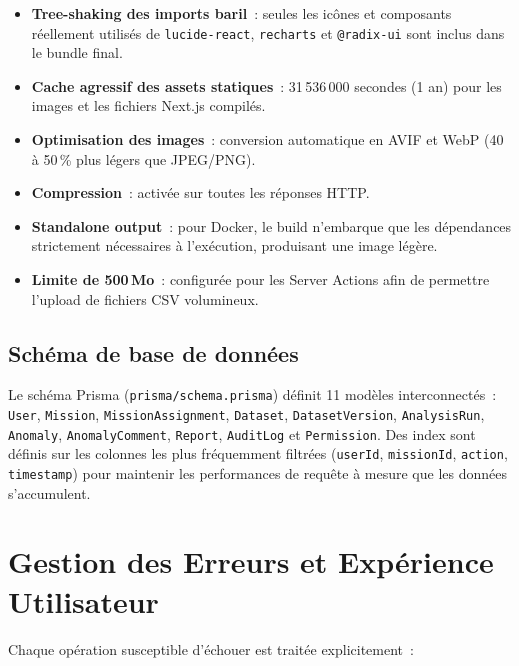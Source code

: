 \begin{itemize}[leftmargin=1.5em]
  \item \textbf{Tree-shaking des imports baril}~: seules les icônes et composants réellement utilisés de \texttt{lucide-react}, \texttt{recharts} et \texttt{@radix-ui} sont inclus dans le bundle final.
  \item \textbf{Cache agressif des assets statiques}~: 31\,536\,000 secondes (1 an) pour les images et les fichiers Next.js compilés.
  \item \textbf{Optimisation des images}~: conversion automatique en AVIF et WebP (40 à 50\,\% plus légers que JPEG/PNG).
  \item \textbf{Compression}~: activée sur toutes les réponses HTTP.
  \item \textbf{Standalone output}~: pour Docker, le build n'embarque que les dépendances strictement nécessaires à l'exécution, produisant une image légère.
  \item \textbf{Limite de 500\,Mo}~: configurée pour les Server Actions afin de permettre l'upload de fichiers CSV volumineux.
\end{itemize}

\subsection{Schéma de base de données}

Le schéma Prisma (\texttt{prisma/schema.prisma}) définit 11 modèles interconnectés~: \texttt{User}, \texttt{Mission}, \texttt{MissionAssignment}, \texttt{Dataset}, \texttt{DatasetVersion}, \texttt{AnalysisRun}, \texttt{Anomaly}, \texttt{AnomalyComment}, \texttt{Report}, \texttt{AuditLog} et \texttt{Permission}. Des index sont définis sur les colonnes les plus fréquemment filtrées (\texttt{userId}, \texttt{missionId}, \texttt{action}, \texttt{timestamp}) pour maintenir les performances de requête à mesure que les données s'accumulent.

\section{Gestion des Erreurs et Expérience Utilisateur}

Chaque opération susceptible d'échouer est traitée explicitement~:

